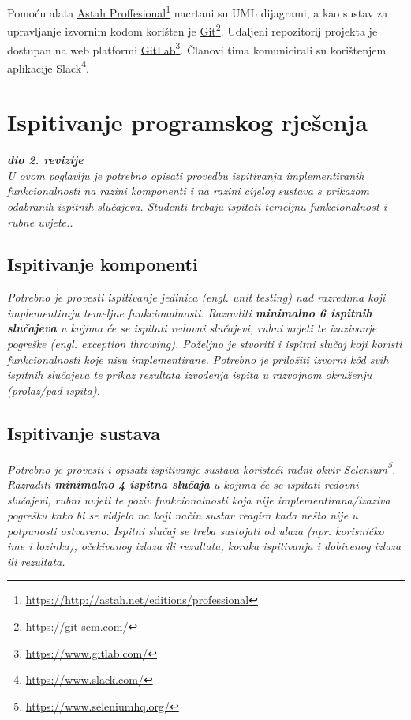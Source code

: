 		 Pomoću alata \underline{Astah Proffesional}\footnote{\url{https://http://astah.net/editions/professional}} nacrtani su UML dijagrami, a kao sustav za upravljanje izvornim kodom korišten je \underline{Git}\footnote{\url{https://git-scm.com/}}. Udaljeni repozitorij projekta je dostupan na web platformi
		\underline{GitLab}\footnote{\url{https://www.gitlab.com/}}. Članovi tima komunicirali su korištenjem aplikacije \underline{Slack}\footnote{\url{https://www.slack.com/}}.
		
		
	\newpage
		\section{Ispitivanje programskog rješenja}
			
			\textbf{\textit{dio 2. revizije}}\\
			
			 \textit{U ovom poglavlju je potrebno opisati provedbu ispitivanja implementiranih funkcionalnosti na razini komponenti i na razini cijelog sustava s prikazom odabranih ispitnih slučajeva. Studenti trebaju ispitati temeljnu funkcionalnost i rubne uvjete..}
	
			
			\subsection{Ispitivanje komponenti}
			\textit{Potrebno je provesti ispitivanje jedinica (engl. unit testing) nad razredima koji implementiraju temeljne funkcionalnosti. Razraditi \textbf{minimalno 6 ispitnih slučajeva} u kojima će se ispitati redovni slučajevi, rubni uvjeti te izazivanje pogreške (engl. exception throwing). Poželjno je stvoriti i ispitni slučaj koji koristi funkcionalnosti koje nisu implementirane. Potrebno je priložiti izvorni kôd svih ispitnih slučajeva te prikaz rezultata izvođenja ispita u razvojnom okruženju (prolaz/pad ispita). }
			
			
			
			\subsection{Ispitivanje sustava}
			
			 \textit{Potrebno je provesti i opisati ispitivanje sustava koristeći radni okvir Selenium\footnote{\url{https://www.seleniumhq.org/}}. Razraditi \textbf{minimalno 4 ispitna slučaja} u kojima će se ispitati redovni slučajevi, rubni uvjeti te poziv funkcionalnosti koja nije implementirana/izaziva pogrešku kako bi se vidjelo na koji način sustav reagira kada nešto nije u potpunosti ostvareno. Ispitni slučaj se treba sastojati od ulaza (npr. korisničko ime i lozinka), očekivanog izlaza ili rezultata, koraka ispitivanja i dobivenog izlaza ili rezultata.\\ }
			 
